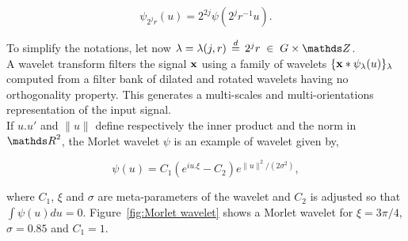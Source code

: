\documentclass[a4paper,11pt]{report}
\begin{document}
      \begin{equation}
				\label{eq:multi-scale directional wavelet}
				\psi_{2^{j}r}(u) = 2^{2j} \psi(2^{j}r^{-1}u).
      \end{equation}
      
      To simplify the notations, let now $\lambda = \lambda(j,r) \; \eqdef \; 2^{j}r \; \in \; G \times \dsZ$.\\
      
      A wavelet transform filters the signal ${\bf x}$ using a family of wavelets $\{{\bf x} \ast \psi_{\lambda}(u)\}_{\lambda}$ computed from a filter bank of dilated and rotated wavelets having no orthogonality property. This generates a multi-scales and multi-orientations representation of the input signal.\\ 
      
      If $u.u'$ and $\|u\|$ define respectively the inner product and the norm in $\dsR^{2}$, the Morlet wavelet $\psi$ is an example of wavelet given by,
      
      \begin{equation*} 
				\label{eq:Morlet wavelet}
				\psi(u) = C_{1}(e^{iu.\xi} - C_{2}) e^{\|u\|^{2}/(2 \sigma^{2})},
      \end{equation*}

      where $C_{1}$, $\xi$ and $\sigma$ are meta-parameters of the wavelet and $C_{2}$ is adjusted so that $\int \psi(u) du = 0$. Figure~\ref{fig:Morlet wavelet} shows a Morlet wavelet for  $\xi= 3\pi/4$, $\sigma=0.85$ and $C_{1}=1$.\\
      
\end{document}

